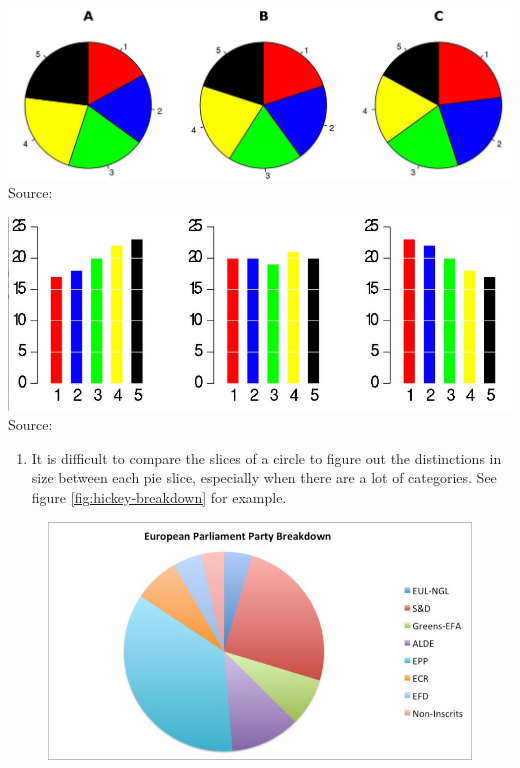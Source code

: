 \documentclass[]{book}
\providecommand{\tightlist}{%
  \setlength{\itemsep}{0pt}\setlength{\parskip}{0pt}}
\theoremstyle{definition}
\theoremstyle{definition}
\theoremstyle{definition}
\theoremstyle{remark}
\begin{document}
\includegraphics{images/hickey-before.jpg} Source:
\citep{hickey-pie-worst}

\includegraphics{images/hickey-after.jpg} Source:
\citep{hickey-pie-worst}

\begin{enumerate}
\def\labelenumi{\arabic{enumi}.}
\setcounter{enumi}{1}
\tightlist
\item
  It is difficult to compare the slices of a circle to figure out the
  distinctions in size between each pie slice, especially when there are
  a lot of categories. See figure \ref{fig:hickey-breakdown} for
  example.
\end{enumerate}

\begin{figure}
\centering
\includegraphics{images/hickey-breakdown.jpg}
\caption{}
\end{figure}
\end{document}
